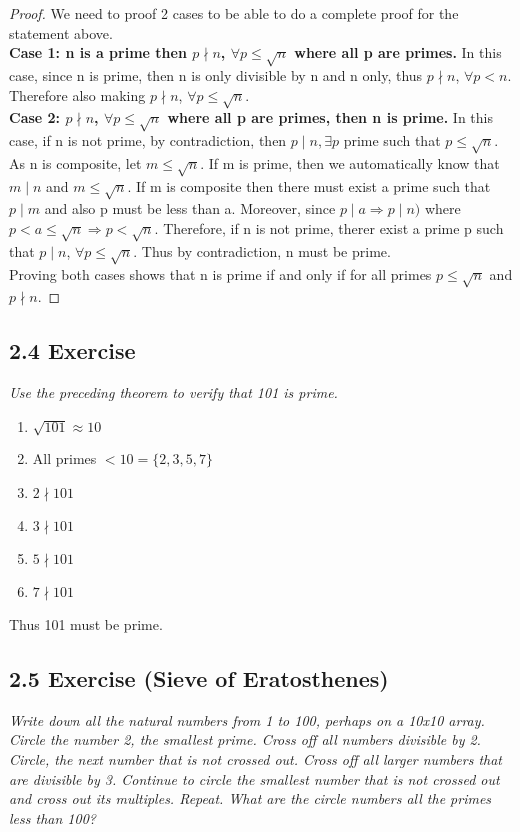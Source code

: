 \documentclass{article}
\begin{document}
\begin{proof}
We need to proof 2 cases to be able to do a complete proof for the statement above.\\
\textbf{Case 1: n is a prime then $p \nmid n$, $\forall p \leq \sqrt{n}$ where all p are primes.} In this case, since n is prime, then n is only divisible by n and n only, thus $p \nmid n$, $\forall p < n$. Therefore also making $p \nmid n$, $\forall p \leq \sqrt{n}$.\\
\textbf{Case 2: $p \nmid n$, $\forall p \leq \sqrt{n}$ where all p are primes, then n is prime.} In this case, if n is not prime, by contradiction, then $p \mid n, \exists p$ prime such that $p \leq \sqrt{n}$. \\
As n is composite, let $m \leq \sqrt{n}$. If m is prime, then we automatically know that $m \mid n$ and $m \leq \sqrt{n}$. If m is composite then there must exist a prime such that $p \mid m$ and also p must be less than a. Moreover, since $p \mid a \Longrightarrow p \mid n)$ where $p < a \leq \sqrt{n} \Longrightarrow p < \sqrt{n}$. Therefore, if n is not prime, therer exist a prime p such that $p \mid n$, $\forall p \leq \sqrt{n}$. Thus by contradiction, n must be prime.\\
Proving both cases shows that n is prime if and only if for all primes $p \leq \sqrt{n}$ and $p \nmid n$.
\end{proof}

\subsection*{2.4 Exercise} 
\quad \textit{Use the preceding theorem to verify that 101 is prime.}

\begin{enumerate}
    \item $\sqrt{101} \approx 10$
    \item All primes $< 10 = \{2,3,5,7\}$
    \item $2 \nmid 101$
    \item $3 \nmid 101$
    \item $5 \nmid 101$
    \item $7 \nmid 101$
\end{enumerate}
Thus 101 must be prime.

\subsection*{2.5 Exercise (Sieve of Eratosthenes)} 
\quad \textit{Write down all the natural numbers from 1 to 100, perhaps on a 10x10 array. Circle the number 2, the smallest prime. Cross off all numbers divisible by 2. Circle, the next number that is not crossed out. Cross off all larger numbers that are divisible by 3. Continue to circle the smallest number that is not crossed out and cross out its multiples. Repeat. What are the circle numbers all the primes less than 100?}
\end{document}
